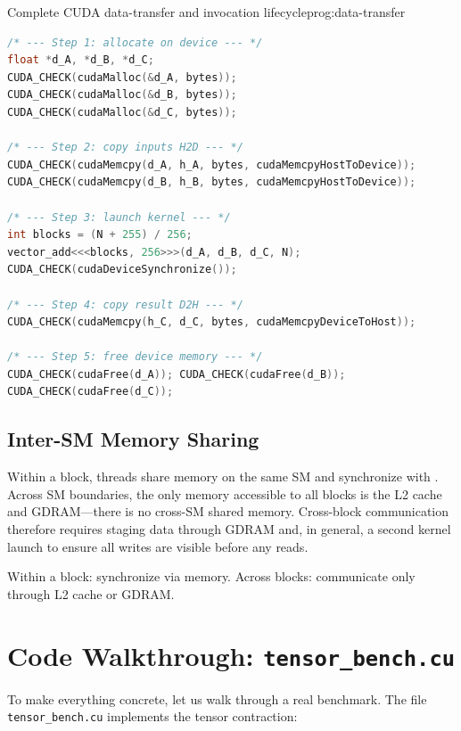 \begin{ppprogram}{Complete CUDA data-transfer and invocation lifecycle}{prog:data-transfer}
\begin{lstlisting}[language=C++]
/* --- Step 1: allocate on device --- */
float *d_A, *d_B, *d_C;
CUDA_CHECK(cudaMalloc(&d_A, bytes));
CUDA_CHECK(cudaMalloc(&d_B, bytes));
CUDA_CHECK(cudaMalloc(&d_C, bytes));

/* --- Step 2: copy inputs H2D --- */
CUDA_CHECK(cudaMemcpy(d_A, h_A, bytes, cudaMemcpyHostToDevice));
CUDA_CHECK(cudaMemcpy(d_B, h_B, bytes, cudaMemcpyHostToDevice));

/* --- Step 3: launch kernel --- */
int blocks = (N + 255) / 256;
vector_add<<<blocks, 256>>>(d_A, d_B, d_C, N);
CUDA_CHECK(cudaDeviceSynchronize());

/* --- Step 4: copy result D2H --- */
CUDA_CHECK(cudaMemcpy(h_C, d_C, bytes, cudaMemcpyDeviceToHost));

/* --- Step 5: free device memory --- */
CUDA_CHECK(cudaFree(d_A)); CUDA_CHECK(cudaFree(d_B));
CUDA_CHECK(cudaFree(d_C));
\end{lstlisting}
\end{ppprogram}

\subsection{Inter-SM Memory Sharing}
\label{ssec:inter-sm}

Within a block, threads share  memory on the same SM and
synchronize with . Across SM boundaries, the only
memory accessible to all blocks is the L2 cache and GDRAM---there is no
cross-SM shared memory. Cross-block communication therefore requires staging
data through GDRAM and, in general, a second kernel launch to ensure all
writes are visible before any reads.

\begin{ppkey}
Within a block: synchronize via  memory.
Across blocks: communicate only through L2 cache or GDRAM.
\end{ppkey}


\section{Code Walkthrough: \texttt{tensor\_bench.cu}}
\label{sec:code-walkthrough}

To make everything concrete, let us walk through a real benchmark.
The file \texttt{tensor\_bench.cu} implements the tensor contraction:

